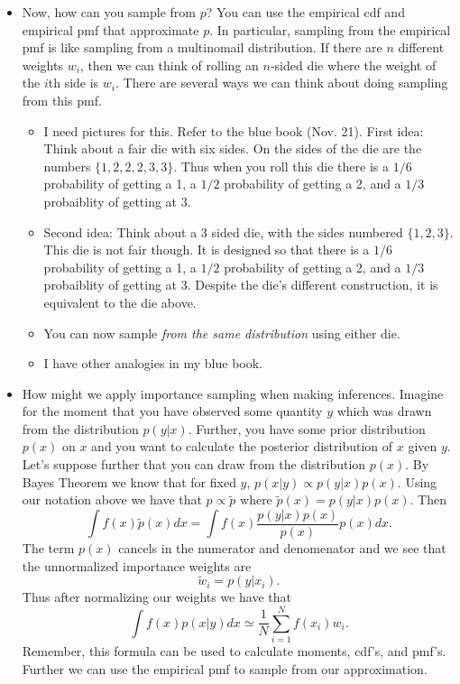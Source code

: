 \documentclass{article}
\begin{document}
\begin{itemize}
\begin{itemize}
\item Now, how can you sample from $p$?  You can use the empirical cdf and empirical pmf that approximate $p$.  In particular, sampling from the empirical pmf is like sampling from a multinomail distribution.  If there are $n$ different weights $w_i$, then we can think of rolling an $n$-sided die where the weight of the $i$th side is $w_i$.  There are several ways we can think about doing sampling from this pmf.
\begin{itemize}
\item I need pictures for this.  Refer to the blue book (Nov. 21).  First idea:  Think about a fair die with six sides.  On the sides of the die are the numbers $\{1, 2, 2, 2, 3, 3\}$.  Thus when you roll this die there is a $1/6$ probability of getting a 1, a $1/2$ probability of getting a 2, and a $1/3$ probaiblity of getting at 3.
\item Second idea: Think about a 3 sided die, with the sides numbered $\{1, 2, 3\}$.  This die is not fair though.  It is designed so that there is a $1/6$ probability of getting a 1, a $1/2$ probability of getting a 2, and a $1/3$ probaiblity of getting at 3.  Despite the die's different construction, it is equivalent to the die above.
\item You can now sample \emph{from the same distribution} using either die.
\item I have other analogies in my blue book.
\end{itemize}
\item How might we apply importance sampling when making inferences.  Imagine for the moment that you have observed some quantity $y$ which was drawn from the distribution $p(y|x)$.  Further, you have some prior distribution $p(x)$ on $x$ and you want to calculate the posterior distribution of $x$ given $y$.  Let's suppose further that you can draw from the distribution $p(x)$.  By Bayes Theorem we know that for fixed $y$, $p(x|y) \propto p(y|x) p(x)$.  Using our notation above we have that $p \propto \tilde p$ where $\tilde p(x) = p(y|x) p(x)$.  Then
\[
\int f(x) \tilde p(x) dx = \int f(x) \frac{p(y|x)p(x)}{p(x)} p(x) dx.
\]
The term $p(x)$ cancels in the numerator and denomenator and we see that the unnormalized importance weights are
\[
\tilde w_i = p(y|x_i).
\]
Thus after normalizing our weights we have that
\[
\int f(x) p(x|y) dx \simeq \frac{1}{N} \sum_{i=1}^N f(x_i) w_i.
\]
Remember, this formula can be used to calculate moments, cdf's, and pmf's.  Further we can use the empirical pmf to sample from our approximation.

\end{itemize}
\end{itemize}
\end{document}
